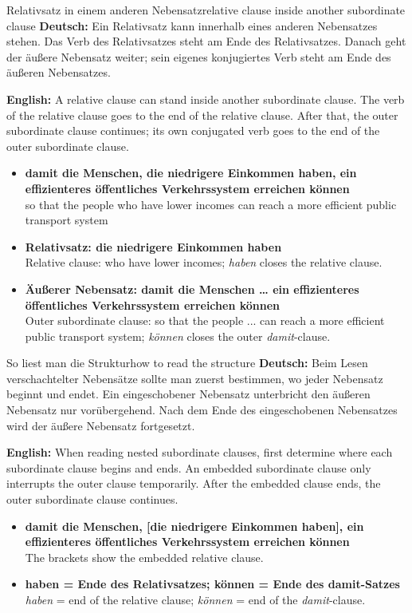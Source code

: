 \documentclass[a4paper,11pt]{article}
\newcommand{\GermanText}[1]{\textbf{Deutsch: }#1\par}
\newcommand{\EnglishText}[1]{{\small\color{SoftGray}\textbf{English: }#1\par}}
\newcommand{\ExampleItem}[2]{\item \textbf{#1}\\{\small\color{SoftGray}#2}}
\begin{document}
        \begin{grammarentry}{Relativsatz in einem anderen Nebensatz}{relative clause inside another subordinate clause}
            \GermanText{Ein Relativsatz kann innerhalb eines anderen Nebensatzes stehen. Das Verb des Relativsatzes steht am Ende des Relativsatzes. Danach geht der äußere Nebensatz weiter; sein eigenes konjugiertes Verb steht am Ende des äußeren Nebensatzes.}
            \EnglishText{A relative clause can stand inside another subordinate clause. The verb of the relative clause goes to the end of the relative clause. After that, the outer subordinate clause continues; its own conjugated verb goes to the end of the outer subordinate clause.}

            \begin{exbox}
                \begin{itemize}
                    \ExampleItem{damit die Menschen, die niedrigere Einkommen haben, ein effizienteres öffentliches Verkehrssystem erreichen können}{so that the people who have lower incomes can reach a more efficient public transport system}
                    \ExampleItem{Relativsatz: die niedrigere Einkommen haben}{Relative clause: who have lower incomes; \textit{haben} closes the relative clause.}
                    \ExampleItem{Äußerer Nebensatz: damit die Menschen \ldots{} ein effizienteres öffentliches Verkehrssystem erreichen können}{Outer subordinate clause: so that the people ... can reach a more efficient public transport system; \textit{können} closes the outer \textit{damit}-clause.}
                \end{itemize}
            \end{exbox}
        \end{grammarentry}

        \begin{grammarentry}{So liest man die Struktur}{how to read the structure}
            \GermanText{Beim Lesen verschachtelter Nebensätze sollte man zuerst bestimmen, wo jeder Nebensatz beginnt und endet. Ein eingeschobener Nebensatz unterbricht den äußeren Nebensatz nur vorübergehend. Nach dem Ende des eingeschobenen Nebensatzes wird der äußere Nebensatz fortgesetzt.}
            \EnglishText{When reading nested subordinate clauses, first determine where each subordinate clause begins and ends. An embedded subordinate clause only interrupts the outer clause temporarily. After the embedded clause ends, the outer subordinate clause continues.}

            \begin{exbox}
                \begin{itemize}
                    \ExampleItem{damit die Menschen, [die niedrigere Einkommen haben], ein effizienteres öffentliches Verkehrssystem erreichen können}{The brackets show the embedded relative clause.}
                    \ExampleItem{haben = Ende des Relativsatzes; können = Ende des damit-Satzes}{\textit{haben} = end of the relative clause; \textit{können} = end of the \textit{damit}-clause.}
                \end{itemize}
            \end{exbox}
        \end{grammarentry}
\end{document}
